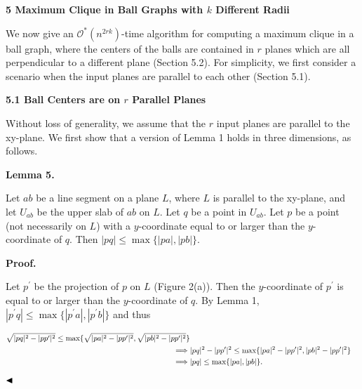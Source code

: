 \documentclass[10pt,a4paper]{amsart}
\begin{document}
\par\medskip\noindent\textbf{5 Maximum Clique in Ball Graphs with $k$ Different Radii}\par
We now give an $\mathcal{O}^{*}(n^{2rk})$-time algorithm for computing a maximum clique in a ball graph, where the centers of the balls are contained in $r$ planes which are all perpendicular to a different plane (Section 5.2). For simplicity, we first consider a scenario when the input planes are parallel to each other (Section 5.1).
\par
\par
\par\medskip\noindent\textbf{5.1 Ball Centers are on $r$ Parallel Planes}\par
Without loss of generality, we assume that the $r$ input planes are parallel to the xy-plane. We first show that a version of Lemma 1 holds in three dimensions, as follows.
\par
\par
\par\medskip\noindent\textbf{Lemma 5.}\par
Let $ab$ be a line segment on a plane $L$, where $L$ is parallel to the xy-plane, and let $U_{ab}$ be the upper slab of $ab$ on $L$. Let $q$ be a point in $U_{ab}$. Let $p$ be a point (not necessarily on $L$) with a $y$-coordinate equal to or larger than the $y$-coordinate of $q$. Then $|pq|\leq\max\{|pa|,|pb|\}$.
\par
\par
\par
\par\medskip\noindent\textbf{Proof.}\par
Let $p^{\prime}$ be the projection of $p$ on $L$ (Figure 2(a)). Then the $y$-coordinate of $p^{\prime}$ is equal to or larger than the $y$-coordinate of $q$. By Lemma 1, $|p^{\prime}q|\leq\max\{|p^{\prime}a|,|p^{\prime}b|\}$ and thus
\par
\[\begin{aligned}
\displaystyle\sqrt{|pq|^{2}-|pp^{\prime}|^{2}}\leq\max\{\sqrt{|pa|^{2}-|pp^{%
\prime}|^{2}},\sqrt{|pb|^{2}-|pp^{\prime}|^{2}}\} \\
\displaystyle\implies & \displaystyle{|pq|^{2}-|pp^{\prime}|^{2}}\leq\max\{{|pa|^{2}-|pp^{\prime}|^{2}%
},{|pb|^{2}-|pp^{\prime}|^{2}}\} \\
\displaystyle\implies & \displaystyle{|pq|}\leq\max\{|pa|,|pb|\}.\ 
\end{aligned}\]
$\hfill\blacktriangleleft$
\end{document}
